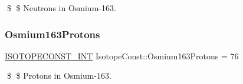 \$ \$ Neutrons in Osmium-\/163. \mbox{\label{group___isotope_const-_osmium-_os163_ga3ab97618a752dcfbd7f5609d349a3395}} 
\subsubsection{\texorpdfstring{Osmium163\+Protons}{Osmium163Protons}}
{\footnotesize\ttfamily \mbox{\hyperlink{group___isotope_const-_macros_ga5f18360b3e99483a35c32d789e62621c}{I\+S\+O\+T\+O\+P\+E\+C\+O\+N\+S\+T\+\_\+\+I\+NT}} Isotope\+Const\+::\+Osmium163\+Protons = 76}

\$ \$ Protons in Osmium-\/163. 